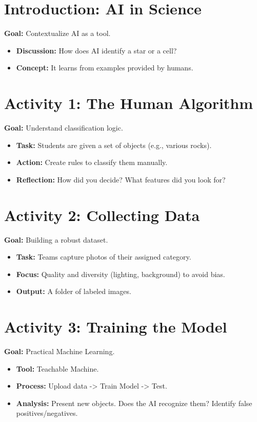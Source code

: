 \documentclass[11pt, a4paper]{article}
\begin{document}
\section{Introduction: AI in Science}
\textbf{Goal:} Contextualize AI as a tool.
\begin{itemize}
    \item \textbf{Discussion:} How does AI identify a star or a cell?
    \item \textbf{Concept:} It learns from examples provided by humans.
\end{itemize}

\section{Activity 1: The Human Algorithm}
\textbf{Goal:} Understand classification logic.
\begin{itemize}
    \item \textbf{Task:} Students are given a set of objects (e.g., various rocks).
    \item \textbf{Action:} Create rules to classify them manually.
    \item \textbf{Reflection:} How did you decide? What features did you look for?
\end{itemize}

\section{Activity 2: Collecting Data}
\textbf{Goal:} Building a robust dataset.
\begin{itemize}
    \item \textbf{Task:} Teams capture photos of their assigned category.
    \item \textbf{Focus:} Quality and diversity (lighting, background) to avoid bias.
    \item \textbf{Output:} A folder of labeled images.
\end{itemize}

\section{Activity 3: Training the Model}
\textbf{Goal:} Practical Machine Learning.
\begin{itemize}
    \item \textbf{Tool:} Teachable Machine.
    \item \textbf{Process:} Upload data -> Train Model -> Test.
    \item \textbf{Analysis:} Present new objects. Does the AI recognize them? Identify false positives/negatives.
\end{itemize}
\end{document}
